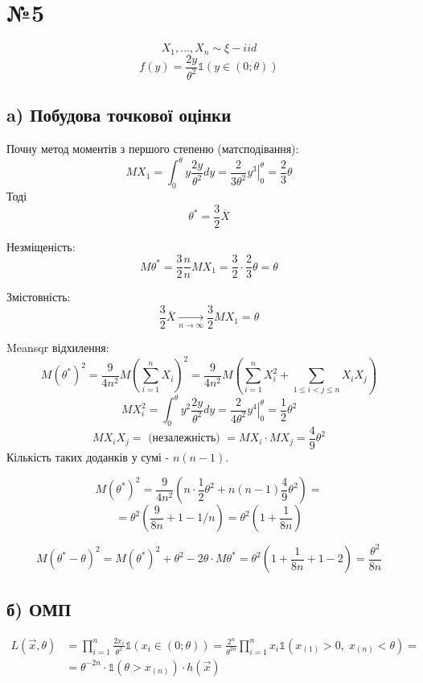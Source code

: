 \documentclass[11pt, a4paper]{article} %
\begin{document}
\section*{№5}
$$X_1, ..., X_n \sim \xi - iid$$
$$f(y) = \frac{2y}{\theta^2} \mathbb{1}(y \in (0;\theta))$$

\subsection*{a) Побудова точкової оцінки}

Почну метод моментів з першого степеню (матсподівання):
$$MX_1 = \int_0^\theta y\frac{2y}{\theta^2} dy = \frac{2}{3\theta^2}\left. y^3 \right|_0^\theta = \frac{2}{3}\theta$$
Тоді $$\theta^* = \frac{3}{2}\overline{X}$$

Незміщеність:
$$M\theta^* = \frac{3}{2} \frac{n}{n} MX_1 = \frac{3}{2} \cdot \frac{2}{3} \theta = \theta$$

Змістовність:
$$\frac{3}{2}\overline{X} \underset{n \to \infty}{\longrightarrow} \frac{3}{2} MX_1 = \theta$$

Meansqr відхилення:
$$M(\theta^*)^2 = \frac{9}{4n^2}M(\sum_{i=1}^n X_i)^2 = \frac{9}{4n^2} M(\sum_{i=1}^n X_i^2 + \sum_{1\le i<j \le n} X_iX_j) $$
$$MX_i^2 = \int_0^\theta y^2\frac{2y}{\theta^2} dy = \frac{2}{4\theta^2}\left. y^4 \right|_0^\theta = \frac{1}{2}\theta^2$$
$$MX_iX_j = \text{ (незалежність) } = MX_i \cdot MX_j = \frac{4}{9}\theta^2$$
Кількість таких доданків у сумі - $n(n-1)$.

$$M(\theta^*)^2 = \frac{9}{4n^2} \left(n \cdot \frac{1}{2}\theta^2 + n(n-1)\frac{4}{9}\theta^2\right) = $$
$$= \theta^2 \left(\frac{9}{8n} + 1 - 1/n\right) = \theta^2 \left(1 + \frac{1}{8n}\right)$$

$$M(\theta^* - \theta)^2 = M(\theta^*)^2 + \theta^2 - 2\theta \cdot M\theta^* = \theta^2 (1 + \frac{1}{8n} + 1 - 2) = \frac{\theta^2}{8n} $$ 

\subsection*{б) ОМП}

\begin{align*}    
L(\vec x, \theta) &= \prod_{i=1}^n \frac{2x_i}{\theta^2} \mathbb{1}(x_i \in (0;\theta)) = \frac{2^n}{\theta^{2n}} \prod_{i=1}^n x_i \mathbb{1}(x_{(1)} > 0,\; x_{(n)}<\theta) = \\
&= \theta^{-2n} \cdot \mathbb{1}(\theta > x_{(n)}) \cdot h(\vec x)
\end{align*}
\end{document}
